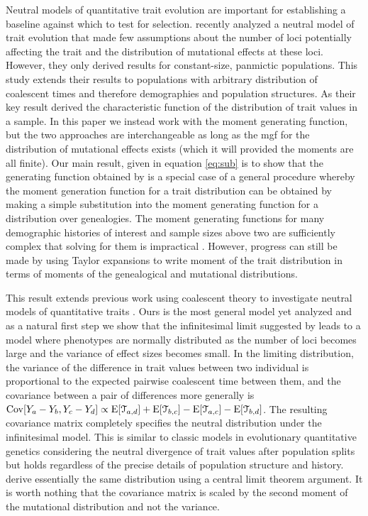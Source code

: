 Neutral models of quantitative trait evolution are important for establishing a
baseline against which to test for selection. \citet{Schraiber2015} recently
analyzed a neutral model of trait evolution that made few assumptions about the
number of loci potentially affecting the trait and the distribution of
mutational effects at these loci. However, they only derived results for
constant-size, panmictic populations. This study extends their results to
populations with arbitrary distribution of coalescent times and therefore
demographies and population structures. As their key result
\citet{Schraiber2015} derived the characteristic function of the distribution of
trait values in a sample. In this paper we instead work with the moment
generating function, but the two approaches are interchangeable as long as the
mgf for the distribution of mutational effects exists (which it will provided
the moments are all finite). Our main result, given in equation \eqref{eq:sub} is
to show that the generating function obtained by \citet{Schraiber2015} is a
special case of a general procedure whereby the moment generation function for a
trait distribution can be obtained by making a simple substitution into the
moment generating function for a distribution over genealogies. The moment
generating functions for many demographic histories of interest and sample sizes
above two are sufficiently complex that solving for them is impractical
\citep{Lohse2011}. However, progress can still be made by using Taylor
expansions to write moment of the trait distribution in terms of moments of the
genealogical and mutational distributions.

This result extends previous work using coalescent theory to investigate neutral
models of quantitative traits \citep{Whitlock1999,Schraiber2015}. Ours is the
most general model yet analyzed and as a natural first step we show that the
infinitesimal limit suggested by \citet{Fisher1918} leads to a model where
phenotypes are normally distributed as the number of loci becomes large and the
variance of effect sizes becomes small. In the limiting distribution, the
variance of the difference in trait values between two individual is
proportional to the expected pairwise coalescent time between them, and the
covariance between a pair of differences more generally is $\mathrm{Cov}[Y_a - Y_b,Y_c -
Y_d] \propto \mathrm{E}[\mathcal{T}_{a,d}] + \mathrm{E}[\mathcal{T}_{b,c}] -
\mathrm{E}[\mathcal{T}_{a,c}] - \mathrm{E}[\mathcal{T}_{b,d}]$. The resulting covariance matrix
completely specifies the neutral distribution under the infinitesimal model.
This is similar to classic models in evolutionary quantitative genetics
considering the neutral divergence of trait values after population splits
\citep{Lande1976,Lynch1989} but holds regardless of the precise details of
population structure and history. \citet{Schraiber2015} derive essentially the
same distribution using a central limit theorem argument. It is worth nothing
that the covariance matrix is scaled by the second moment of the mutational
distribution and not the variance.


